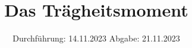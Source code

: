 

\subject{v101}
\title{Das Trägheitsmoment}
\date{%
  Durchführung: 14.11.2023
  \hspace{3em}
  Abgabe: 21.11.2023
}



\maketitle
\thispagestyle{empty}
\tableofcontents
\newpage








\printbibliography{}


